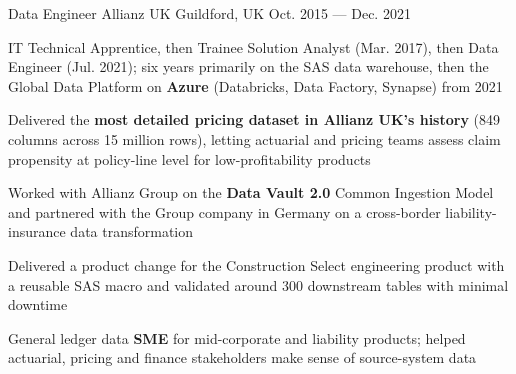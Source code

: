\begin{cventries}
  \cventry
  {Data Engineer} %
  {Allianz UK } %
  {Guildford, UK} %
  {Oct. 2015 --- Dec. 2021} %
  {
    \begin{cvitems} %
    \item {IT Technical Apprentice, then Trainee Solution Analyst (Mar. 2017), then Data Engineer (Jul. 2021); six years primarily on the SAS data warehouse, then the Global Data Platform on \textbf{Azure} (Databricks, Data Factory, Synapse) from 2021}
    \item {Delivered the \textbf{most detailed pricing dataset in Allianz UK's history} (849 columns across 15 million rows), letting actuarial and pricing teams assess claim propensity at policy-line level for low-profitability products}
    \item {Worked with Allianz Group on the \textbf{Data Vault 2.0} Common Ingestion Model and partnered with the Group company in Germany on a cross-border liability-insurance data transformation}
    \item {Delivered a product change for the Construction Select engineering product with a reusable SAS macro and validated around 300 downstream tables with minimal downtime}
    \item {General ledger data \textbf{SME} for mid-corporate and liability products; helped actuarial, pricing and finance stakeholders make sense of source-system data}
    \end{cvitems}
  }

\end{cventries}
